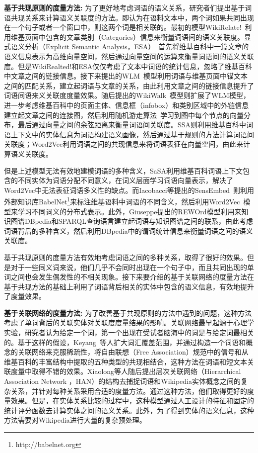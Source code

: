 \textbf{基于共现原则的度量方法:}
为了更好地考虑词语的语义关系，研究者们提出基于词语共现关系来计算语义关联度的方法。即认为在语料文本中，两个词如果共同出现在一个句子或者一个窗口中，则这两个词是相关联的。最初的模型WikiRelate!~\cite{aaai/StrubeP06}利用维基页面中包含的文章类别（Categories）信息来衡量词语间的语义关联度。显式语义分析（Explicit Semantic Analysis，ESA）~\cite{ijcai/GabrilovichM07}首先将维基百科中一篇文章的语义信息表示为高维向量空间，然后通过向量空间的运算来衡量词语间的语义关联度。但是WikiRealted!和ESA仅仅考虑了文本中词语的统计信息，忽略了维基百科中文章之间的链接信息。接下来提出的WLM~\cite{aaai/Milne08}模型利用词语与维基页面中锚文本之间的匹配关系，建立起词语与文章的关系，由此利用文章之间的链接信息提升了词语间语来义关联度度量效果。随后提出的WikiWalk~\cite{textgraphs/YehRMAS09}模型则扩展了WLM模型，进一步考虑维基百科中的页面主体、信息框（infobox）和类别区域中的外链信息建立起文章之间的连接图，然后利用随机游走算法~\cite{emnlp/HughesR07}学习到图中每个节点的向量分布，最后通过向量之间的余弦距离来衡量词语间关联度。SSA\cite{aaai/HassanM11}则利用维基百科中词语上下文中的实体信息为词语构建语义画像，然后通过基于规则的方法计算词语间关联度；Word2Vec\cite{corr/Mikolov13}利用词语之间的共现信息来将词语表征在向量空间，由此来计算语义关联度。

但是上述模型无法有效地建模词语的多种含义，SaSA\cite{aaai/WuG15}利用维基百科词语上下文包含的不同实体为词语分配不同意义，在词义层面学习词语向量表示，解决了Word2Vec中无法表征词语多义性的缺点。而Iacobacci等提出的SensEmbed~\cite{acl/IacobacciPN15}则利用外部知识库BabelNet\footnote{http://babelnet.org}来标注维基语料中词语的不同含义，然后利用Word2Vec~\cite{corr/Mikolov13}模型来学习不同词义的分布式表示。此外，Giuseppe提出的REWOrd模型利用来知识图谱DBpedia和SPARQL查询语言建立起词语与知识图谱之间的联系，由此考虑词语背后的多种含义，然后利用DBpedia中的谓词统计信息来衡量词语之间的语义关联度。

基于共现原则的度量方法有效地考虑词语之间的多种关系，取得了很好的效果。但是对于一些同义词来说，他们几乎不会同时出现在一个句子中，而且共同出现的单词之间也会发生偶发性的不相关现象。接下来要介绍的基于关联网络的度量方法在基于共现方法的基础上利用了词语背后相关的实体中包含的语义信息，有效地提升了度量效果。

\textbf{基于关联网络的度量方法:}
为了改善基于共现原则的方法中遇到的问题，这种方法考虑了单词背后的关联实体对关联度度量结果的影响。关联网络最早起源于心理学实验，研究者认为给定一个词，第一个出现在受试者脑海中的词是与给定词最相关的。基于这样的假设，Keyang~\cite{aaai/ZhangZH15}等人扩大词汇覆盖范围，并通过构造一个词语和概念的关联网络来克服稀疏性，将自由联想（Free Association）规范中的信号和从维基百科的丰富结构中提取的五种类型的共现相结合，这种方法在词语和短文本关联度量中取得不错的效果。Xiaolong\cite{aaai/GongXH18}等人随后提出层次关联网络（Hierarchical Association Network ，HAN）的结构去捕捉词语和Wikipedia实体概念之间的复杂关系，并针对每种关系采用合适的度量方法。通过这种方法，他们取得更好的度量效果。但是，在实体关系比较的过程中，这种模型通过人工设计的特征和固定的统计评分函数去计算实体之间的语义关系。此外，为了得到实体的语义信息，这种方法需要对Wikipedia进行大量的复杂预处理。

